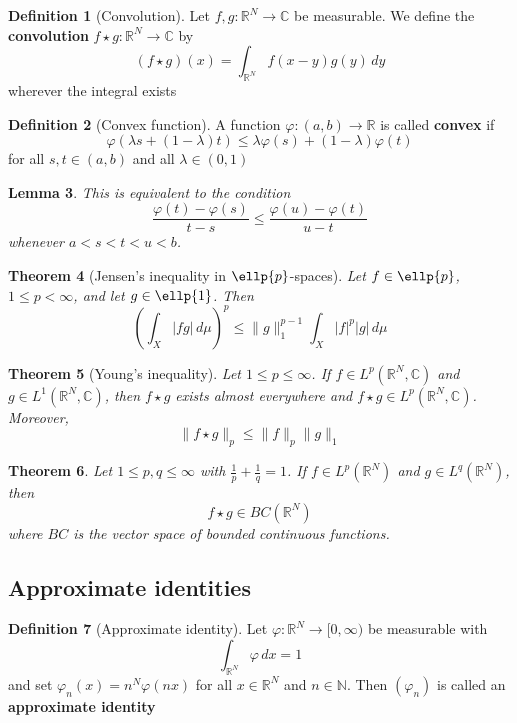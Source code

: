 \documentclass[10pt, oneside, reqno]{amsart}
\theoremstyle{plain}%
\newtheorem{thm}{Theorem}[section]
\newtheorem{lem}[thm]{Lemma}
\theoremstyle{definition}
\newtheorem{defn}[thm]{Definition}
\theoremstyle{remark}
\newcommand{\R}{\mathbb{R}}
\newcommand{\Com}{\mathbb{C}}
\newcommand{\dmu}{\, d \mu}
\renewcommand{\phi}{\varphi}
\begin{document}
\begin{defn}[Convolution]
    Let $f,g : \R^N \rightarrow \Com$ be measurable.  We define the \textbf{convolution} $f \star g : \R^N \rightarrow \Com$ by \[
        (f \star g) (x) = \int_{\R^N} f(x-y) g(y) \, dy
    \]
    wherever the integral exists
\end{defn}

\begin{defn}[Convex function]
    A function $\phi : (a,b) \rightarrow \R$ is called \textbf{convex} if \[
        \phi(\lambda s + (1-\lambda)t) \leq \lambda \phi(s) + (1-\lambda) \phi(t)
    \] for all $s,t \in (a,b)$ and all $\lambda \in (0,1)$
\end{defn}

\begin{lem}
    This is equivalent to the condition\[
        \frac{\phi(t) - \phi(s)}{t-s} \leq \frac{\phi(u) - \phi(t)}{u - t}
    \] whenever $a < s < t < u < b$.
\end{lem}

\begin{thm}[Jensen's inequality in $\ellp{p}$-spaces]
    Let $f \in \ellp{p}$, $1\leq p < \infty$, and let $g \in \ellp{1}$.  Then \[
        \left(\int_X |fg| \dmu \right)^p \leq \|g\|^{p-1}_1 \int_X |f|^p |g| \dmu
    \]
\end{thm}

\begin{thm}[Young's inequality]
    Let $1 \leq p \leq \infty$.  If $f \in L^p(\R^N, \Com)$ and $g \in L^1(\R^N, \Com)$, then $f \star g$ exists almost everywhere and $f \star g \in L^p(\R^N, \Com)$.  Moreover, \[
        \|f \star g \|_p \leq \|f\|_p \|g \|_1
    \]
\end{thm}

\begin{thm}
    Let $1 \leq p, q \leq \infty$ with $\frac{1}{p} + \frac{1}{q} = 1$.  If $f \in L^p(\R^N)$ and $g \in L^q(\R^N)$, then \[
        f \star g \in BC(\R^N)
    \] where $BC$ is the vector space of bounded continuous functions.
\end{thm}


\subsection{Approximate identities} %
\label{sub:approximate_identities}

\begin{defn}[Approximate identity]
    Let $\phi: \R^N \rightarrow [0,\infty)$ be measurable with \[
        \int_{\R^N} \phi \, dx = 1
    \] and set $\phi_n(x) = n^N \phi(n x)$ for all $x \in \R^N$ and $n \in \mathbb{N}$.  Then $(\phi_n)$ is called an \textbf{approximate identity}
\end{defn}
\end{document}
